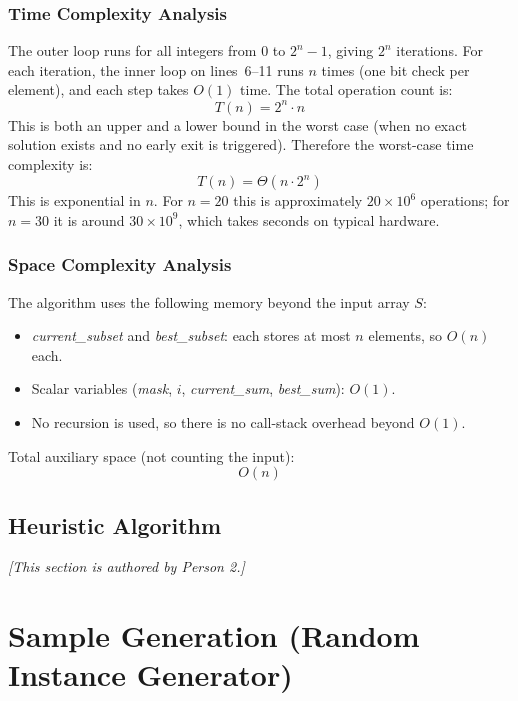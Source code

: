\documentclass[12pt,a4paper]{article}
\theoremstyle{definition}
\begin{document}
\subsubsection{Time Complexity Analysis}

The outer loop runs for all integers from $0$ to $2^n - 1$, giving $2^n$
iterations. For each iteration, the inner loop on lines~6--11 runs $n$ times
(one bit check per element), and each step takes $O(1)$ time. The total
operation count is:
\[
  T(n) = 2^n \cdot n
\]
This is both an upper and a lower bound in the worst case (when no exact
solution exists and no early exit is triggered). Therefore the worst-case
time complexity is:
\[
  \boxed{T(n) = \Theta(n \cdot 2^n)}
\]
This is exponential in $n$. For $n = 20$ this is approximately $20 \times 10^6$
operations; for $n = 30$ it is around $30 \times 10^9$, which takes seconds
on typical hardware.

\subsubsection{Space Complexity Analysis}

The algorithm uses the following memory beyond the input array $S$:

\begin{itemize}[noitemsep]
  \item \textit{current\_subset} and \textit{best\_subset}: each stores at
        most $n$ elements, so $O(n)$ each.
  \item Scalar variables (\textit{mask}, $i$, \textit{current\_sum},
        \textit{best\_sum}): $O(1)$.
  \item No recursion is used, so there is no call-stack overhead beyond $O(1)$.
\end{itemize}

Total auxiliary space (not counting the input):
\[
  \boxed{O(n)}
\]

\subsection{Heuristic Algorithm}
\textit{[This section is authored by Person 2.]}


\section{Sample Generation (Random Instance Generator)}
\end{document}
